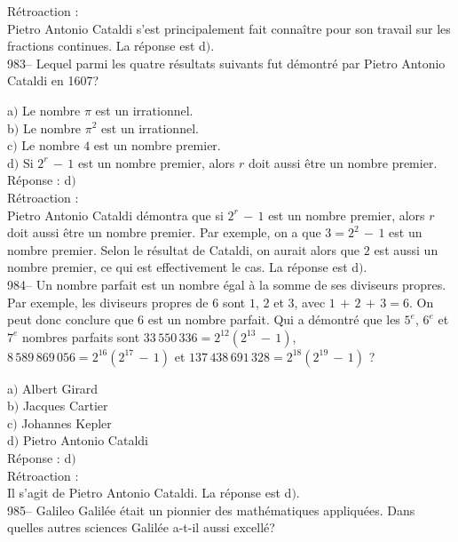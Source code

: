 ﻿\documentclass[letterpaper, 12pt]{article}
\begin{document}
R\'etroaction : \\
Pietro Antonio Cataldi s'est principalement fait conna\^itre pour son
travail sur les fractions continues. La r\'eponse est d$)$.\\

983-- Lequel parmi les quatre r\'esultats suivants fut d\'emontr\'e
par Pietro Antonio Cataldi en 1607?

a$)$ Le nombre $\pi$ est un irrationnel. \\
b$)$ Le nombre $\pi^2$ est un irrationnel. \\
c$)$ Le nombre $4$ est un nombre premier. \\
d$)$ Si $2^r\,-\,1$ est un nombre premier, alors $r$ doit aussi \^etre un
nombre premier.\\

R\'eponse : d$)$\\

R\'etroaction : \\
Pietro Antonio Cataldi d\'emontra que si $2^r\,-\,1$ est un nombre
premier, alors $r$ doit aussi \^etre un nombre premier. Par exemple,
on a que $3=2^2\,-\,1$ est un nombre premier. Selon le r\'esultat de
Cataldi, on aurait alors que $2$ est aussi un nombre premier, ce qui
est effectivement le cas.
La r\'eponse est d$)$.\\

984-- Un nombre parfait est un nombre \'egal \`a la somme de ses
diviseurs propres. Par exemple, les diviseurs propres de $6$ sont
$1$, $2$ et $3$, avec $1\,+\,2\,+\,3=6$. On peut donc conclure que
$6$ est un nombre parfait. Qui a d\'emontr\'e que les $5^e$, $6^e$
et $7^e$ nombres parfaits sont $33\,550\,336=2^{12}(2^{13}\,-\,1)$,
$8\,589\,869\,056=2^{16}(2^{17}\,-\,1)$ et
$137\,438\,691\,328=2^{18}(2^{19}\,-\,1)$ ?

a$)$ Albert Girard\\
b$)$ Jacques Cartier \\
c$)$ Johannes Kepler \\
d$)$ Pietro Antonio Cataldi\\

R\'eponse : d$)$\\

R\'etroaction : \\
Il s'agit de Pietro Antonio Cataldi. La r\'eponse est d$)$.\\

985-- Galileo Galil\'ee \'etait un pionnier des math\'ematiques
appliqu\'ees. Dans quelles autres sciences Galil\'ee a-t-il aussi
excell\'e?
\end{document}
